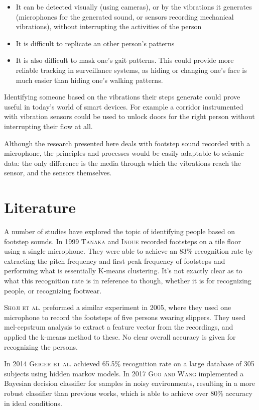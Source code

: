 \documentclass{article}
\begin{document}
\begin{itemize}
  \item{It can be detected visually (using cameras), or by the vibrations it generates (microphones for the generated sound, or sensors recording mechanical vibrations), without interrupting the activities of the person}
  \item{It is difficult to replicate an other person's patterns}
  \item {It is also difficult to mask one's gait patterns. This could provide more reliable tracking in surveillance systems, as hiding or changing one's face is much easier than hiding one's walking patterns.}
\end{itemize} 

Identifying someone based on the vibrations their steps generate could prove useful in today's world of smart devices. For example a corridor instrumented with vibration sensors could be used to unlock doors for the right person without interrupting their flow at all.

Although the research presented here deals with footstep sound recorded with a microphone, the principles and processes would be easily adaptable to seismic data: the only difference is the media through which the vibrations reach the sensor, and the sensors themselves.

\section{Literature}

A number of studies have explored the topic of identifying people based on footstep sounds. In 1999 \textsc{Tanaka} and \textsc{Inoue} recorded footsteps on a tile floor using a single microphone. They were able to achieve an 83\% recognition rate by extracting the pitch frequency and first peak frequency of footsteps and performing what is essentially K-means clustering. It's not exactly clear as to what this recognition rate is in reference to though, whether it is for recognizing people, or recognizing footwear.

\textsc{Shoji et al.} preformed a similar experiment in 2005, where they used one microphone to record the footsteps of five persons wearing slippers. They used mel-cepstrum analysis to extract a feature vector from the recordings, and applied the k-means method to these. No clear overall accuracy is given for recognizing the persons.

In 2014 \textsc{Geiger et al.} achieved 65.5\% recognition rate on a large database of 305 subjects using hidden markov models. In 2017 \textsc{Guo and Wang} implemented a Bayesian decision classifier for samples in noisy environments, resulting in a more robust classifier than previous works, which is able to achieve over 80\% accuracy in ideal conditions. 
\end{document}
